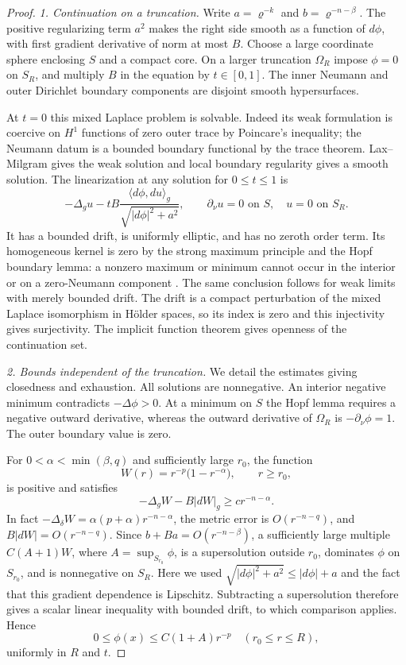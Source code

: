 \begin{proof}
\medskip\noindent\emph{1. Continuation on a truncation.}
Write $a=\varrho^{-k}$ and $b=\varrho^{-n-\beta}$.  The
positive regularizing term $a^2$ makes the right side smooth
as a function of $d\phi$, with first gradient derivative of
norm at most $B$.  Choose a large coordinate sphere enclosing
$S$ and a compact core.  On a larger truncation $\Omega_R$
impose $\phi=0$ on $S_R$, and multiply $B$ in the equation by
$t\in[0,1]$.  The inner Neumann and outer Dirichlet boundary
components are disjoint smooth hypersurfaces.

At $t=0$ this mixed Laplace problem is solvable.  Indeed its
weak formulation is coercive on $H^1$ functions of zero outer
trace by Poincare's inequality; the Neumann datum is a bounded
boundary functional by the trace theorem.  Lax--Milgram gives
the weak solution and local boundary regularity gives a smooth
solution.  The linearization at any solution for $0\le t\le1$
is
\[
 -\Delta_g u-tB\frac{\langle d\phi,du\rangle_g}
                     {\sqrt{|d\phi|^2+a^2}},
 \qquad \partial_\nu u=0\text{ on }S,\quad u=0\text{ on }S_R.
\]
It has a bounded drift, is uniformly elliptic, and has no
zeroth order term.  Its homogeneous kernel is zero by the
strong maximum principle and the Hopf boundary lemma: a
nonzero maximum or minimum cannot occur in the interior or
on a zero-Neumann component \cite[Chapter~3]{GilbargTrudinger}.
The same conclusion follows
for weak limits with merely bounded drift.  The drift is a
compact perturbation of the mixed Laplace isomorphism in
Hölder spaces, so its index is zero and this injectivity gives
surjectivity.  The implicit function theorem gives openness
of the continuation set.

\medskip\noindent\emph{2. Bounds independent of the truncation.}
We detail the estimates giving closedness and exhaustion.
All solutions are nonnegative.  An interior negative minimum
contradicts $-\Delta\phi>0$.  At a minimum on $S$ the Hopf
lemma requires a negative outward derivative, whereas the
outward derivative of $\Omega_R$ is $-\partial_\nu\phi=1$.
The outer boundary value is zero.

For $0<\alpha<\min(\beta,q)$ and sufficiently large $r_0$,
the function
\[
 W(r)=r^{-p}\bigl(1-r^{-\alpha}\bigr),\qquad r\ge r_0,
\]
is positive and satisfies
\begin{equation}\label{eq:end:strict-barrier}
 -\Delta_gW-B|dW|_g\ge c r^{-n-\alpha}.
\end{equation}
In fact $-\Delta_\delta W=\alpha(p+\alpha)r^{-n-\alpha}$,
the metric error is $O(r^{-n-q})$, and
$B|dW|=O(r^{-n-q})$.  Since $b+Ba=O(r^{-n-\beta})$,
a sufficiently large multiple $C(A+1)W$, where
$A=\sup_{S_{r_0}}\phi$, is a supersolution outside $r_0$,
dominates $\phi$ on $S_{r_0}$, and is nonnegative on $S_R$.
Here we used
$\sqrt{|d\phi|^2+a^2}\le|d\phi|+a$ and the fact that this
gradient dependence is Lipschitz.  Subtracting a supersolution
therefore gives a scalar linear inequality with bounded drift,
to which comparison applies.  Hence
\begin{equation}\label{eq:end:strict-tail-bound}
 0\le\phi(x)\le C(1+A)r^{-p}\quad(r_0\le r\le R),
\end{equation}
uniformly in $R$ and $t$.


\end{proof}

